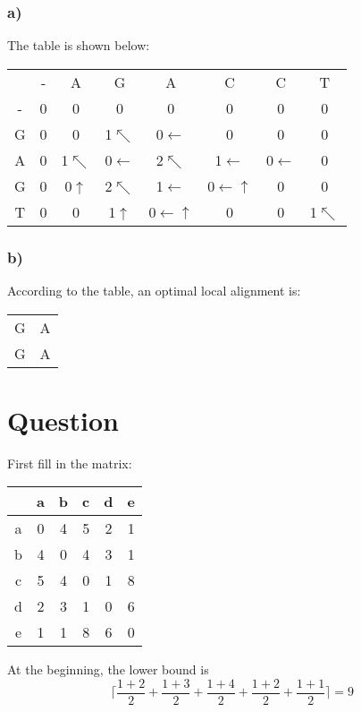 \documentclass{article}
\begin{document}
\subsubsection{a)}	
The table is shown below:
\begin{center}
\begin{tabular}{c|c|c|c|c|c|c|c|}
\multicolumn{1}{c}{ } & \multicolumn{1}{c}{-} & \multicolumn{1}{c}{A} & \multicolumn{1}{c}{G} & \multicolumn{1}{c}{A} & \multicolumn{1}{c}{C} & \multicolumn{1}{c}{C} & \multicolumn{1}{c}{T} \\
\cline{2-8}
- & 0 & \cellcolor{red!50}0 & 0 & 0 & 0 & 0 & 0 \\
\cline{2-8}
G & \cellcolor{red!50}0 & 0 & \cellcolor{red!50}1$\nwarrow$ & 0$\leftarrow$ & 0 & 0 & 0 \\
\cline{2-2}
A & 0 & \cellcolor{red!50}1$\nwarrow$ & 0$\leftarrow$ & \cellcolor{red!50}2$\nwarrow$ & 1$\leftarrow$ & 0$\leftarrow$ & 0 \\
\cline{2-2}
G & 0 & 0$\uparrow$ & \cellcolor{red!50}2$\nwarrow$ & 1$\leftarrow$ & 0$\leftarrow\uparrow$ & 0 & 0 \\
\cline{2-2}
T & 0 & 0 & 1$\uparrow$ & 0$\leftarrow\uparrow$ & 0 & 0 & 1$\nwarrow$ \\
\cline{2-8}
\end{tabular}
\end{center}

\subsubsection{b)}
According to the table, an optimal local alignment is:
\begin{tabular}{cc}
G & A \\
G & A
\end{tabular}

\section{Question }
First fill in the matrix:
\begin{center}
\begin{tabular}{c|ccccc}
  & a & b & c & d & e \\
\hline
a & 0 & 4 & 5 & 2 & 1 \\
b & 4 & 0 & 4 & 3 & 1 \\
c & 5 & 4 & 0 & 1 & 8 \\
d & 2 & 3 & 1 & 0 & 6 \\
e & 1 & 1 & 8 & 6 & 0 \\
\end{tabular}
\end{center}
At the beginning, the lower bound is 
\[
\lceil\frac{1+2}{2} + \frac{1+3}{2} + \frac{1+4}{2} + \frac{1+2}{2} + \frac{1+1}{2}\rceil = 9
\]
\end{document}
